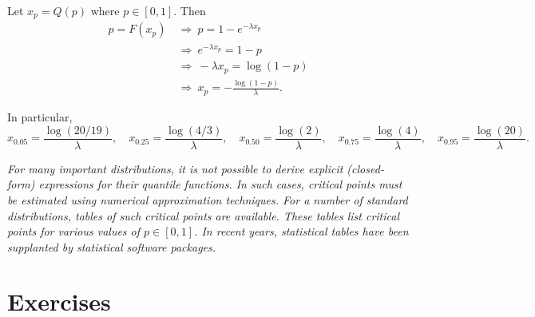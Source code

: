 \begin{solution}
Let $x_p = Q(p)$ where $p\in[0,1]$. Then
\begin{align*}
p = F(x_p) 
	& \ \Rightarrow\ p = 1 - e^{-\lambda x_p} \\
	& \ \Rightarrow\ e^{-\lambda x_p} = 1 - p \\
	& \ \Rightarrow\ -\lambda x_p = \log(1 - p) \\
	& \ \Rightarrow\ x_p = -\frac{\log(1 - p)}{\lambda}.
\end{align*}

In particular,
\[
x_{0.05} = \frac{\log(20/19)}{\lambda}, \quad
x_{0.25} = \frac{\log(4/3)}{\lambda}, \quad
x_{0.50} = \frac{\log(2)}{\lambda}, \quad
x_{0.75} = \frac{\log(4)}{\lambda}, \quad
x_{0.95} = \frac{\log(20)}{\lambda}.
\]
\end{solution}
\normalsize

\newpage

\begin{remark}
\bit
\it
For many important distributions, it is not possible to derive explicit (closed-form) expressions for their quantile functions. 
\it
In such cases, critical points must be estimated using numerical approximation techniques. 
\it
For a number of standard distributions, tables of such critical points are available.
\it
These tables list critical points for various values of $p\in[0,1]$.
\it 
In recent years, statistical tables have been supplanted by statistical software packages.
\eit
\end{remark}

\section{Exercises}


\endinput

